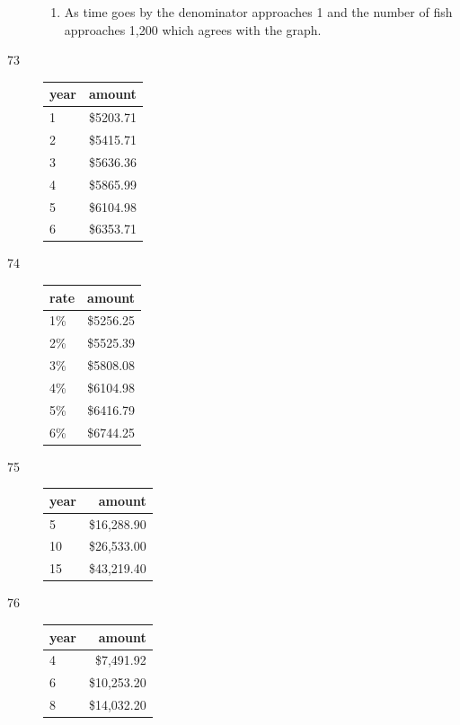 \documentclass{exam}
\begin{document}
\begin{description}
\begin{enumerate}[a]
          \item As time goes by the denominator approaches 1 and the number of fish approaches 1,200 which agrees with
            the graph.

        \end{enumerate}

      \item[73]
        \begin{tabular}[H]{lr}
          \toprule
          year & amount \\
          \midrule
          1    & \$5203.71 \\
          2    & \$5415.71 \\
          3    & \$5636.36 \\
          4    & \$5865.99 \\
          5    & \$6104.98 \\
          6    & \$6353.71 \\
          \bottomrule
        \end{tabular}

      \item[74]
        \begin{tabular}[H]{lr}
          \toprule
          rate & amount \\
          \midrule
          1\% & \$5256.25 \\
          2\% & \$5525.39 \\
          3\% & \$5808.08 \\
          4\% & \$6104.98 \\
          5\% & \$6416.79 \\
          6\% & \$6744.25 \\
          \bottomrule
        \end{tabular}

      \item[75]
        \begin{tabular}[H]{lr}
          \toprule
          year & amount \\
          \midrule
          5    & \$16,288.90 \\
          10   & \$26,533.00 \\
          15   & \$43,219.40 \\
          \bottomrule
        \end{tabular}

      \item[76]
        \begin{tabular}[H]{lr}
          \toprule
          year & amount \\
          \midrule
          4    & \$7,491.92 \\
          6    & \$10,253.20 \\
          8    & \$14,032.20 \\
          \bottomrule
        \end{tabular}


\end{description}
\end{document}
